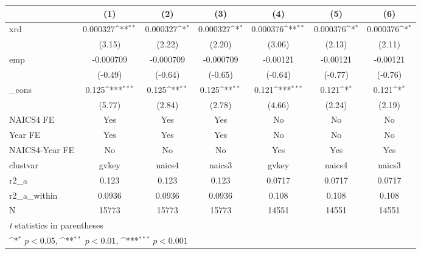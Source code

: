 {
\def\sym#1{\ifmmode^{#1}\else\(^{#1}\)\fi}
\begin{tabular}{l*{6}{c}}
\hline\hline
            &\multicolumn{1}{c}{(1)}         &\multicolumn{1}{c}{(2)}         &\multicolumn{1}{c}{(3)}         &\multicolumn{1}{c}{(4)}         &\multicolumn{1}{c}{(5)}         &\multicolumn{1}{c}{(6)}         \\
\hline
xrd         &    0.000327\sym{**} &    0.000327\sym{*}  &    0.000327\sym{*}  &    0.000376\sym{**} &    0.000376\sym{*}  &    0.000376\sym{*}  \\
            &      (3.15)         &      (2.22)         &      (2.20)         &      (3.06)         &      (2.13)         &      (2.11)         \\
[1em]
emp         &   -0.000709         &   -0.000709         &   -0.000709         &    -0.00121         &    -0.00121         &    -0.00121         \\
            &     (-0.49)         &     (-0.64)         &     (-0.65)         &     (-0.64)         &     (-0.77)         &     (-0.76)         \\
[1em]
\_cons      &       0.125\sym{***}&       0.125\sym{**} &       0.125\sym{**} &       0.121\sym{***}&       0.121\sym{*}  &       0.121\sym{*}  \\
            &      (5.77)         &      (2.84)         &      (2.78)         &      (4.66)         &      (2.24)         &      (2.19)         \\
[1em]
NAICS4 FE   &         Yes         &         Yes         &         Yes         &          No         &          No         &          No         \\
[1em]
Year FE     &         Yes         &         Yes         &         Yes         &          No         &          No         &          No         \\
[1em]
NAICS4-Year FE&          No         &          No         &          No         &         Yes         &         Yes         &         Yes         \\
\hline
clustvar    &       gvkey         &      naics4         &      naics3         &       gvkey         &      naics4         &      naics3         \\
r2\_a        &       0.123         &       0.123         &       0.123         &      0.0717         &      0.0717         &      0.0717         \\
r2\_a\_within &      0.0936         &      0.0936         &      0.0936         &       0.108         &       0.108         &       0.108         \\
N           &       15773         &       15773         &       15773         &       14551         &       14551         &       14551         \\
\hline\hline
\multicolumn{7}{l}{\footnotesize \textit{t} statistics in parentheses}\\
\multicolumn{7}{l}{\footnotesize \sym{*} \(p<0.05\), \sym{**} \(p<0.01\), \sym{***} \(p<0.001\)}\\
\end{tabular}
}
